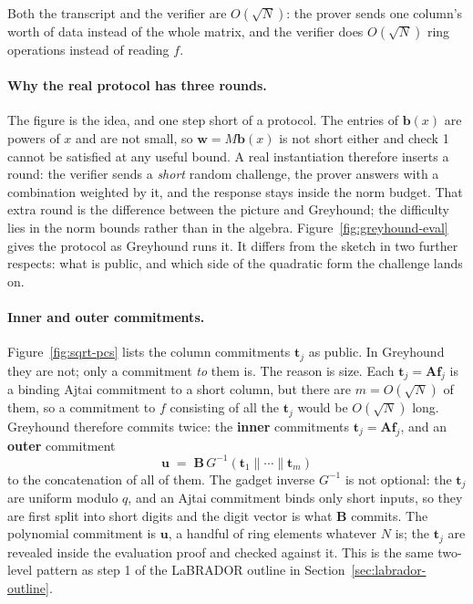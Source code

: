 Both the transcript and the verifier are $O(\sqrt{N})$: the prover sends one
column's worth of data instead of the whole matrix, and the verifier does
$O(\sqrt{N})$ ring operations instead of reading $f$.

\paragraph{Why the real protocol has three rounds.}
The figure is the idea, and one step short of a protocol. The entries of
$\mathbf{b}(x)$ are powers of $x$ and are not small, so $\mathbf{w}=M\mathbf{b}(x)$
is not short either and check 1 cannot be satisfied at any useful bound. A real
instantiation therefore inserts a round: the verifier sends a \emph{short}
random challenge, the prover answers with a combination weighted by it, and the
response stays inside the norm budget. That extra round is the difference between
the picture and Greyhound; the difficulty lies in the norm bounds rather than
in the algebra. Figure~\ref{fig:greyhound-eval} gives the protocol as Greyhound
runs it. It differs from the sketch in two further respects: what is public,
and which side of the quadratic form the challenge lands on.

\paragraph{Inner and outer commitments.}
Figure~\ref{fig:sqrt-pcs} lists the column commitments $\mathbf{t}_j$ as public.
In Greyhound they are not; only a commitment \emph{to} them is. The reason is
size. Each $\mathbf{t}_j=\mathbf{A}\mathbf{f}_j$ is a binding Ajtai commitment
to a short column, but there are $m=O(\sqrt{N})$ of them, so a commitment to
$f$ consisting of all the $\mathbf{t}_j$ would be $O(\sqrt{N})$ long. Greyhound
therefore commits twice: the \textbf{inner} commitments
$\mathbf{t}_j=\mathbf{A}\mathbf{f}_j$, and an \textbf{outer} commitment
\[
  \mathbf{u}\;=\;\mathbf{B}\,G^{-1}(\mathbf{t}_1\|\cdots\|\mathbf{t}_m)
\]
to the concatenation of all of them. The gadget inverse $G^{-1}$ is not
optional: the $\mathbf{t}_j$ are uniform modulo $q$, and an Ajtai commitment
binds only short inputs, so they are first split into short digits and the
digit vector is what $\mathbf{B}$ commits. The polynomial commitment is
$\mathbf{u}$, a handful of ring elements whatever $N$ is; the $\mathbf{t}_j$
are revealed inside the evaluation proof and checked against it. This is the
same two-level pattern as step 1 of the LaBRADOR outline in
Section~\ref{sec:labrador-outline}.

